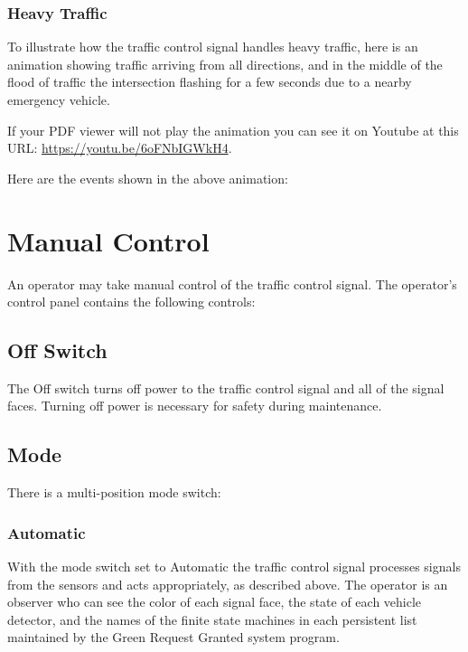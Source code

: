 \documentclass[letterpaper,twoside]{article}
\begin{document}
\subsubsection{Heavy Traffic}

To illustrate how the traffic control signal handles heavy traffic,
here is an animation showing traffic arriving from all directions,
and in the middle of the flood of traffic the intersection flashing
for a few seconds due to a nearby emergency vehicle.

\noindent{}

If your PDF viewer will not play the animation you can see it on Youtube
at this URL:
\href{https://youtu.be/6oFNbIGWkH4}{https://youtu.be/6oFNbIGWkH4}.

Here are the events shown in the above animation:



\section{Manual Control}

An operator may take manual control of the traffic control signal.
The operator's control panel contains the following controls:

\subsection{Off Switch}
The Off switch turns off power to the traffic control signal and all
of the signal faces.  Turning off power is necessary for safety during
maintenance.

\subsection{Mode}

There is a multi-position mode switch:

\subsubsection{Automatic}

With the mode switch set to Automatic the traffic control signal
processes signals from the sensors and acts appropriately, as described
above.  The operator is an observer who can see the color of each
signal face, the state of each vehicle detector,
and the names of the finite state machines in each persistent list
maintained by the Green Request Granted system program.
\end{document}

